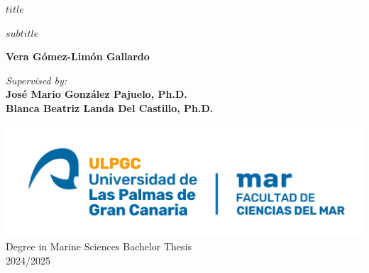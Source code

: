 %
%
%
% 


\begin{center}
    \Huge
    \textbf{$title$}
        
    \vspace{0.5cm}
    \LARGE
    $subtitle$
        
    \vspace{0.5cm}
    \textbf{Vera Gómez-Limón Gallardo}
        
    \vspace{0.5cm}
    \Large
    \textit{Supervised by:}\\
    \textbf{José Mario González Pajuelo, Ph.D.\\Blanca Beatriz Landa Del Castillo, Ph.D.}
        
    \vfill
    \includegraphics[width=\textwidth]{titlepage/logo.png}
    Degree in Marine Sciences Bachelor Thesis\\2024/2025
        
\end{center}
	
	